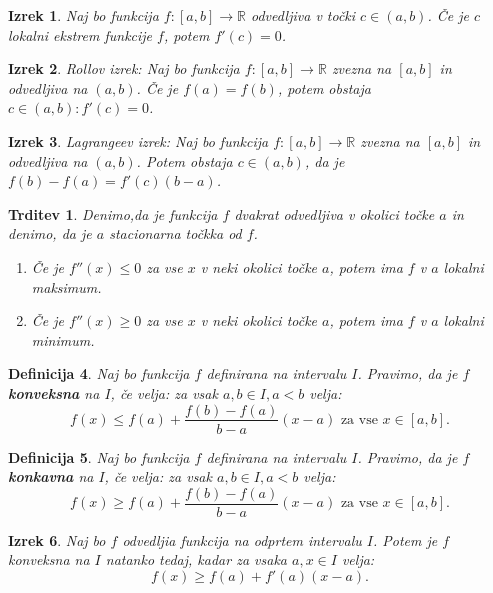 \documentclass[a4paper,12pt]{report}
\newtheorem{izrek}{Izrek}[section]
\newtheorem{definicija}[izrek]{Definicija}
\newtheorem{trditev}{Trditev}
\begin{document}
\begin{izrek}
    Naj bo funkcija $f: [a,b] \to \mathbb{R}$ odvedljiva v točki $c \in (a,b)$. 
    Če je $c$ lokalni ekstrem funkcije $f$, potem $f'(c)=0$. 
\end{izrek}

\begin{izrek}
    \emph{Rollov izrek}: Naj bo funkcija $f: [a,b] \to \mathbb{R}$ zvezna na $[a,b]$ in odvedljiva na $(a,b)$. 
    Če je $f(a)=f(b)$, potem obstaja $c \in (a,b): f'(c)=0$.
\end{izrek}

\begin{izrek}
    \emph{Lagrangeev izrek}: Naj bo funkcija $f: [a,b] \to \mathbb{R}$ zvezna na $[a,b]$ in odvedljiva na $(a,b)$. 
    Potem obstaja $c \in (a,b)$, da je $f(b)-f(a)=f'(c)(b-a)$.
\end{izrek}

\begin{trditev}
    Denimo,da je funkcija $f$ dvakrat odvedljiva v okolici točke $a$ in denimo, da je $a$ stacionarna točkka od $f$.
    \begin{enumerate}
        \item Če je $f''(x) \leq 0$ za vse $x$ v neki okolici točke $a$, potem ima $f$ v $a$ lokalni maksimum.
        \item Če je $f''(x) \geq 0$ za vse $x$ v neki okolici točke $a$, potem ima $f$ v $a$ lokalni minimum.
    \end{enumerate}
\end{trditev}

\begin{definicija}
    Naj bo funkcija $f$ definirana na intervalu $I$. Pravimo, da je $f$ \textbf{konveksna} na $I$, če velja: za vsak $a,b \in I, a < b$ velja: 
    $$f(x) \leq f(a) + \frac{f(b)-f(a)}{b-a} (x-a) \text{ za vse } x \in [a,b].$$
\end{definicija}

\begin{definicija}
    Naj bo funkcija $f$ definirana na intervalu $I$. Pravimo, da je $f$ \textbf{konkavna} na $I$, če velja: za vsak $a,b \in I, a < b$ velja: 
    $$f(x) \geq f(a) + \frac{f(b)-f(a)}{b-a} (x-a) \text{ za vse } x \in [a,b].$$
\end{definicija}

\begin{izrek}
    Naj bo $f$ odvedljia funkcija na odprtem intervalu $I$. Potem je $f$ konveksna na $I$ natanko tedaj, 
    kadar za vsaka $a,x \in I$ velja: $$f(x) \geq f(a) + f'(a)(x-a).$$
\end{izrek}
\end{document}
